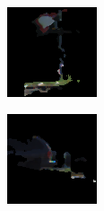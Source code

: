 \begin{figure}[h!]
\begin{subfigure}[c]{0.3\textwidth}
        \label{fig:eval:texture:222_1}
    \end{subfigure}
    \begin{subfigure}[c]{0.3\textwidth}
        \includegraphics[width=\textwidth]{../Material/texture0_0.png}
        \label{fig:eval:texture:0_0}
    \end{subfigure}
    \begin{subfigure}[c]{0.3\textwidth}
        \includegraphics[width=\textwidth]{../Material/texture0_1.png}

\end{subfigure}
\end{figure}
